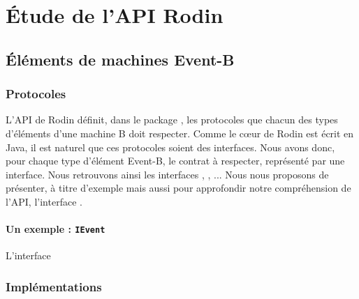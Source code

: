 \section{Étude de l'API Rodin}

\subsection{Éléments de machines Event-B}

\subsubsection{Protocoles}

L'API de Rodin définit, dans le package , les protocoles que chacun des types d'éléments %
d'une machine B doit respecter.
Comme le cœur de Rodin est écrit en Java, il est naturel que ces protocoles soient des interfaces.
Nous avons donc, pour chaque type d'élément Event-B, le contrat à respecter, représenté par une interface.
Nous retrouvons ainsi les interfaces , , ...
Nous nous proposons de présenter, à titre d'exemple mais aussi pour approfondir notre compréhension de l'API, l'interface .

\paragraph{Un exemple : \texttt{IEvent}}

L'interface

\subsubsection{Implémentations}
